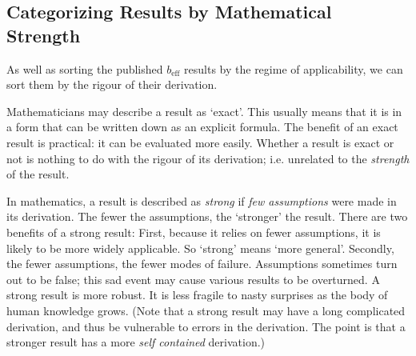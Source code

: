 \documentclass[12pt, a4paper, twoside, openright]{book}
\newcommand{\beff}{\ensuremath{b_{\mathrm{eff}}}}
\begin{document}
\begin{table}
\begin{center}
\end{center}

\end{table}

\newpage


\subsection*{Categorizing Results by Mathematical Strength}

As well as sorting the published $\beff$ results by the regime of applicability, we can sort them by the rigour of their derivation.

Mathematicians may describe a result as `exact'.  This usually means that it is in a form that can be written down as an explicit formula.  The benefit of an exact result is practical: it can be evaluated more easily.  Whether a result is exact or not is nothing to do with the rigour of its derivation; i.e. unrelated to the \emph{strength} of the result. 

In mathematics, a result is described as \emph{strong} if \emph{few assumptions} were made in its derivation.  The fewer the assumptions, the `stronger' the result.
There are two benefits of a strong result: First, because it relies on fewer assumptions, it is likely to be more widely applicable.  So `strong' means `more general'.  Secondly, the fewer assumptions, the fewer modes of failure.  Assumptions sometimes turn out to be false; this sad event may cause various results to be overturned.  A strong result is more robust.  It is less fragile to nasty surprises as the body of human knowledge grows.  (Note that a strong result may have a long complicated derivation, and thus be vulnerable to errors in the derivation.  The point is that a stronger result has a more \emph{self contained} derivation.)
\end{document}
